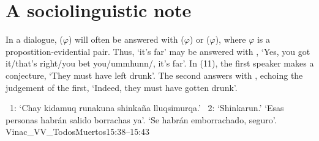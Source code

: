 \section{A sociolinguistic note}
In a dialogue, \phono{-\uo}($\varphi$) will often be answered with ($\varphi$) or ($\varphi$), where $\varphi$ is a propostition-evidential pair. Thus,  `it's far' may be answered with ,  `Yes, you got it/that's right/you bet you/ummhunn/, it's far'. In (11), the first speaker makes a  conjecture, `They must have left drunk'. The second answers with , echoing the judgement of the first, `Indeed, they must have gotten drunk'.

%
{\spkr~1: `Chay kidamuq runakuna shinka\~na lluqsimurqa.' \spkr~2: `Shinkarun.'}%
{}%
{`Esas personas habr\'an salido borrachas ya'. `Se habr\'an emborrachado, seguro'.}%
{Vinac\_VV\_TodosMuertos}{15:38--15:43}%
